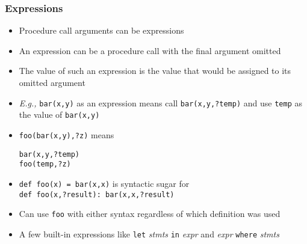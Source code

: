\documentclass[12pt]{beamer}
\begin{document}
\begin{frame}
\frametitle{Expressions}
\begin{itemize}
\item Procedure call arguments can be expressions
\item An expression can be a procedure call with the final argument omitted
\item The value of such an expression is the value that would be assigned
  to its omitted argument
\item \emph{E.g.,} \texttt{bar(x,y)} as an expression means call
  \texttt{bar(x,y,?temp)} and use \texttt{temp} as the value of
  \texttt{bar(x,y)}
\item \texttt{foo(bar(x,y),?z)} \quad means \quad
  \begin{minipage}[c]{0.4\linewidth}
  \texttt{bar(x,y,?temp)} \\
  \texttt{foo(temp,?z)}
  \end{minipage}
\item \texttt{def foo(x) = bar(x,x)} is syntactic sugar for \\
\texttt{def foo(x,?result): bar(x,x,?result)}
\item Can use \texttt{foo} with either syntax regardless of which
  definition was used
\item A few built-in expressions like \texttt{let} \emph{stmts}
  \texttt{in} \emph{expr} and \emph{expr} \texttt{where} \emph{stmts}
\end{itemize}
\end{frame}
\end{document}

